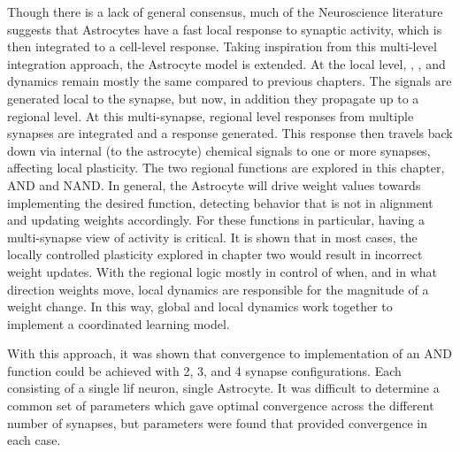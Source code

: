 Though there is a lack of general consensus, much of the Neuroscience literature
suggests that Astrocytes have a fast local response to synaptic activity, which
is then integrated to a cell-level response. Taking inspiration from this
multi-level integration approach, the Astrocyte model is extended. At the local
level, \ipt, \kp, and \ca dynamics remain mostly the same compared to previous
chapters. The \ca signals are generated local to the synapse, but now, in
addition they propagate up to a regional level. At this multi-synapse, regional
level \ca responses from multiple synapses are integrated and a response
generated. This response then travels back down via internal (to the astrocyte)
chemical signals to one or more synapses, affecting local plasticity. The two
regional functions are explored in this chapter, AND and NAND. In general, the
Astrocyte will drive weight values towards implementing the desired function,
detecting behavior that is not in alignment and updating weights
accordingly. For these functions in particular, having a multi-synapse view of
activity is critical. It is shown that in most cases, the locally controlled
plasticity explored in chapter two would result in incorrect weight
updates. With the regional logic mostly in control of when, and in what
direction weights move, local dynamics are responsible for the magnitude of a
weight change. In this way, global and local dynamics work together to implement
a coordinated learning model.

With this approach, it was shown that convergence to implementation of an AND
function could be achieved with 2, 3, and 4 synapse configurations. Each
consisting of a single \Gls{lif} neuron, single Astrocyte. It was difficult to
determine a common set of parameters which gave optimal convergence across the
different number of synapses, but parameters were found that provided
convergence in each case.
